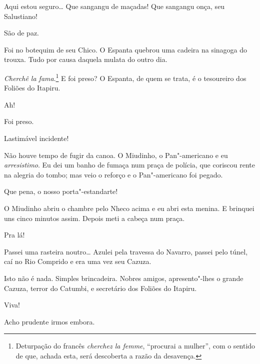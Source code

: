 

  
Aqui estou seguro\ldots{} Que sangangu de maçadas!
Que sangangu onça, seu Salustiano!

 São de paz.

 Foi no botequim de
seu Chico. O Espanta quebrou uma cadeira na sinagoga
do trouxa. Tudo por causa daquela mulata do outro dia.

 \textit{Cherchê la fama}.\footnote{
Deturpação do francês \textit{cherchez la femme}, ``procurai a mulher'', com
o sentido de que, achada esta, será descoberta a razão da desavença.}
E foi preso?  O Espanta, de quem se trata,
é o tesoureiro dos Foliões do Itapiru.

 Ah!

 Foi preso.

 Lastimável incidente!

 Não houve tempo de
fugir da canoa. O Miudinho, o Pan"-americano e eu
\textit{arresistimo}. Eu dei um banho de
fumaça num praça de polícia, que coriscou rente na
alegria do tombo; mas veio o reforço e o
Pan"-americano foi pegado.

 Que pena, o nosso
porta"-estandarte!

 O Miudinho abriu o chambre pelo Nheco
acima e eu abri esta menina.  E brinquei uns
cinco minutos assim. Depois meti a cabeça num praça.

 Pra lá!

 Passei uma rasteira noutro\ldots{}  Azulei pela travessa do Navarro, passei pelo túnel, caí no
Rio Comprido e era uma vez seu Cazuza. 

 
 Isto não é nada.  Simples brincadeira.  Nobres
amigos, apresento"-lhes o grande Cazuza, terror do Catumbi, e secretário dos
Foliões do Itapiru.

 Viva!

   Acho prudente irmos embora.

